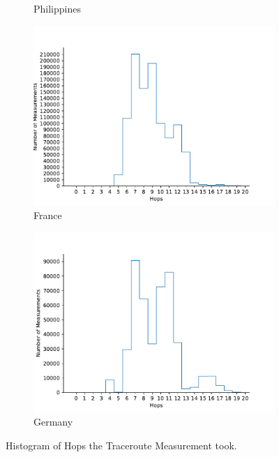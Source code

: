 \begin{figure}
\begin{subfigure}[b]{0.48\linewidth}
		\caption{Philippines}
	\end{subfigure}
	\begin{subfigure}[b]{0.48\linewidth}
		\includegraphics[width=\linewidth]{chapters/4-results/traceroute/img/hops_FR.pdf}
		\caption{France}
	\end{subfigure}
	\begin{subfigure}[b]{0.48\linewidth}
		\includegraphics[width=\linewidth]{chapters/4-results/traceroute/img/hops_DE.pdf}
		\caption{Germany}
	\end{subfigure}
	\caption{Histogram of Hops the Traceroute Measurement took.}
	\label{fig:hops-per-measument}
\end{figure}

